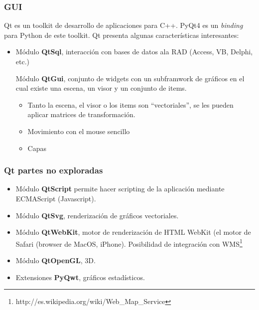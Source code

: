 \documentclass{beamer}
\begin{document}
\begin{frame}
 \frametitle{GUI}
  Qt es un toolkit de desarrollo de aplicaciones para C++.
  PyQt4 es un \emph{binding} para Python de este toolkit.
  Qt presenta algunas características interesantes:
  \begin{itemize}
    \item Módulo \textbf{QtSql}, interacción con bases de datos ala RAD (Access, VB, Delphi, etc.)
    
    \begin{item}Módulo \textbf{QtGui}, conjunto de widgets con un subframwork de 
      gráficos en el cual existe una escena, un visor y un conjunto de items.
      \begin{itemize}
	\item Tanto la escena, el visor o los items son ``vectoriales'', se les pueden
	  aplicar matrices de transformación.
	\item Movimiento con el mouse sencillo
	\item Capas
      \end{itemize}
    \end{item}
  \end{itemize}
\end{frame}
\begin{frame}
  \frametitle{Qt partes no exploradas}
  \begin{itemize}
   \item Módulo \textbf{QtScript} permite hacer scripting de la aplicación
    mediante ECMAScript (Javascript).
   \item Módulo \textbf{QtSvg}, renderización de gráficos vectoriales.
   \item Módulo \textbf{QtWebKit}, motor de renderización de HTML WebKit (el motor 
    de Safari (browser de MacOS, iPhone). Posibilidad de integración con WMS\footnote{
      http://es.wikipedia.org/wiki/Web\_Map\_Service
    }
    \item Módulo \textbf{QtOpenGL}, 3D.
    \item Extensiones \textbf{PyQwt}, gráficos estadísticos.
  \end{itemize}

\end{frame}

%   
\end{document}
